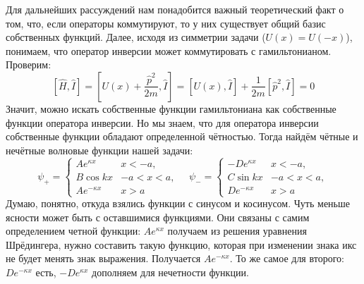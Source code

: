 Для дальнейших рассуждений нам понадобится важный теоретический факт о том, что, если операторы коммутируют, то у них существует общий базис собственных функций. Далее, исходя из симметрии задачи ($U(x) = U(-x)$), понимаем, что оператор инверсии может коммутировать с гамильтонианом. Проверим:
\[
[\hat{H}, \hat{I}] = [U(x) + \frac{\hat{p}^2}{2m}, \hat{I}] = [U(x), \hat{I}] + \frac{1}{2m} [\hat{p}^2, \hat{I}] = 0
\]
Значит, можно искать собственные функции гамильтониана как собственные функции оператора инверсии. Но мы знаем, что для оператора инверсии собственные функции обладают определенной чётностью. Тогда найдём чётные и нечётные волновые функции нашей задачи:
\[
\psi_+ =
\begin{cases}
    Ae^{\kappa x}& x < -a,\\
    B \cos kx & -a < x < a,\\
    Ae^{-\kappa x}& x > a
\end{cases}\quad
\psi_- =
\begin{cases}
    -De^{\kappa x}& x < -a,\\
    C \sin kx & -a < x < a,\\
    De^{-\kappa x}& x > a
\end{cases}
\]
Думаю, понятно, откуда взялись функции с синусом и косинусом. Чуть меньше ясности может быть с оставшимися функциями. Они связаны с самим определением четной функции: $Ae^{\kappa x}$ получаем из решения уравнения Шрёдингера, нужно составить такую функцию, которая при изменении знака икс не будет менять знак выражения. Получается $Ae^{-\kappa x}$. То же самое для второго: $De^{-\kappa x}$ есть, $-De^{\kappa x}$  дополняем для нечетности функции.


